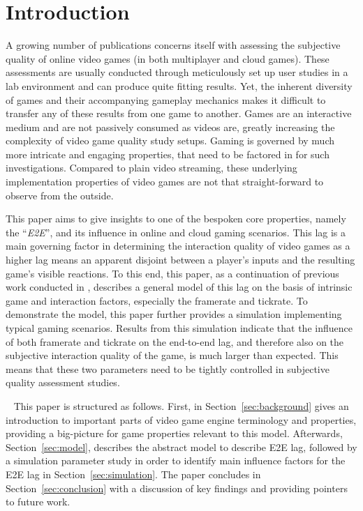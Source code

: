 \section{Introduction}
\label{sec:introduction}


A growing number of publications concerns itself with assessing the subjective quality of online video games (in both multiplayer and cloud games). These assessments are usually conducted through meticulously set up user studies in a lab environment and can produce quite fitting results. Yet, the inherent diversity of games and their accompanying gameplay mechanics makes it difficult to transfer any of these results from one game to another. Games are an interactive medium and are not passively consumed as videos are, greatly increasing the complexity of video game quality study setups. Gaming is governed by much more intricate and engaging properties, that need to be factored in for such investigations. Compared to plain video streaming, these underlying implementation properties of video games are not that straight-forward to observe from the outside.

This paper aims to give insights to one of the bespoken core properties, namely the ``\textit{\gls{E2E}}'', and its influence in online and cloud gaming scenarios. This lag is a main governing factor in determining the interaction quality of video games as a higher lag means an apparent disjoint between a player's inputs and the resulting game's visible reactions. To this end, this paper, as a continuation of previous work conducted in \cite{metzger2016gamesframes}, describes a general model of this lag on the basis of intrinsic game and interaction factors, especially the framerate and tickrate. To demonstrate the model, this paper further provides a simulation implementing typical gaming scenarios. Results from this simulation indicate that the influence of both framerate and tickrate on the end-to-end lag, and therefore also on the subjective interaction quality of the game, is much larger than expected. This means that these two parameters need to be tightly controlled in subjective quality assessment studies.

~\newline
This paper is structured as follows. First, in Section~\ref{sec:background} gives an introduction to important parts of video game engine terminology and properties, providing a big-picture for game properties relevant to this model. Afterwards, Section~\ref{sec:model}, describes the abstract model to describe \gls{E2E} lag, followed by a simulation parameter study in order to identify main influence factors for the \gls{E2E} lag in Section~\ref{sec:simulation}. The paper concludes in Section~\ref{sec:conclusion} with a discussion of key findings and providing pointers to future work.


